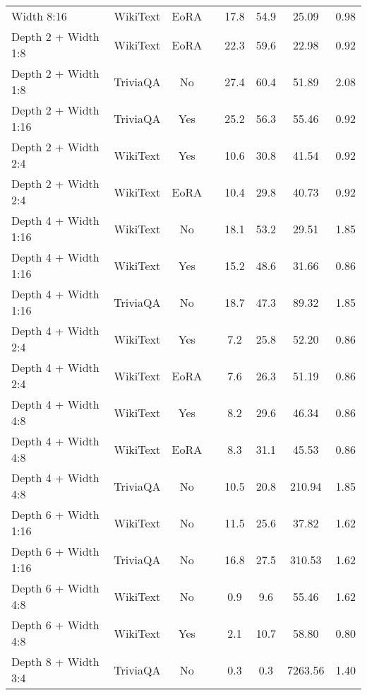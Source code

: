 {\begin{table}[htbp]
\begin{tabular}{lcclcccc}
Width 8:16 & WikiText & EoRA & & 17.8 & 54.9 & 25.09 & 0.98 \\
Depth 2 + Width 1:8 & WikiText & EoRA & & 22.3 & 59.6 & 22.98 & 0.92 \\
Depth 2 + Width 1:8 & TriviaQA & No & & 27.4 & 60.4 & 51.89 & 2.08 \\
Depth 2 + Width 1:16 & TriviaQA & Yes & & 25.2 & 56.3 & 55.46 & 0.92 \\
Depth 2 + Width 2:4 & WikiText & Yes & & 10.6 & 30.8 & 41.54 & 0.92 \\
Depth 2 + Width 2:4 & WikiText & EoRA & & 10.4 & 29.8 & 40.73 & 0.92 \\
Depth 4 + Width 1:16 & WikiText & No & & 18.1 & 53.2 & 29.51 & 1.85 \\
Depth 4 + Width 1:16 & WikiText & Yes & & 15.2 & 48.6 & 31.66 & 0.86 \\
Depth 4 + Width 1:16 & TriviaQA & No & & 18.7 & 47.3 & 89.32 & 1.85 \\
Depth 4 + Width 2:4 & WikiText & Yes & & 7.2 & 25.8 & 52.20 & 0.86 \\
Depth 4 + Width 2:4 & WikiText & EoRA & & 7.6 & 26.3 & 51.19 & 0.86 \\
Depth 4 + Width 4:8 & WikiText & Yes & & 8.2 & 29.6 & 46.34 & 0.86 \\
Depth 4 + Width 4:8 & WikiText & EoRA & & 8.3 & 31.1 & 45.53 & 0.86 \\
Depth 4 + Width 4:8 & TriviaQA & No & & 10.5 & 20.8 & 210.94 & 1.85 \\
Depth 6 + Width 1:16 & WikiText & No & & 11.5 & 25.6 & 37.82 & 1.62 \\
Depth 6 + Width 1:16 & TriviaQA & No & & 16.8 & 27.5 & 310.53 & 1.62 \\
Depth 6 + Width 4:8 & WikiText & No & & 0.9 & 9.6 & 55.46 & 1.62 \\
Depth 6 + Width 4:8 & WikiText & Yes & & 2.1 & 10.7 & 58.80 & 0.80 \\
Depth 8 + Width 3:4 & TriviaQA & No & & 0.3 & 0.3 & 7263.56 & 1.40 \\
\hline
\end{tabular}
\end{table}
}


